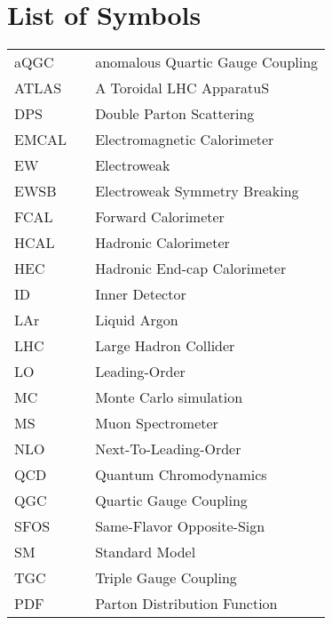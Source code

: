 \chapter*{List of Symbols}
  \begin{tabular}{lp{}p{}}
    aQGC        & \dotfill & anomalous Quartic Gauge Coupling \\
    ATLAS       & \dotfill & A Toroidal LHC ApparatuS \\
    DPS         & \dotfill & Double Parton Scattering \\
    EMCAL       & \dotfill & Electromagnetic Calorimeter \\
    EW          & \dotfill & Electroweak \\
    EWSB        & \dotfill & Electroweak Symmetry Breaking \\
    FCAL        & \dotfill & Forward Calorimeter \\
    HCAL        & \dotfill & Hadronic Calorimeter \\
    HEC         & \dotfill & Hadronic End-cap Calorimeter \\
    ID          & \dotfill & Inner Detector \\
    LAr         & \dotfill & Liquid Argon \\
    LHC         & \dotfill & Large Hadron Collider \\
    LO          & \dotfill & Leading-Order \\
    MC          & \dotfill & Monte Carlo simulation \\
    MS          & \dotfill & Muon Spectrometer \\
    NLO         & \dotfill & Next-To-Leading-Order \\
    QCD         & \dotfill & Quantum Chromodynamics \\
    QGC         & \dotfill & Quartic Gauge Coupling \\
    SFOS        & \dotfill & Same-Flavor Opposite-Sign \\
    SM          & \dotfill & Standard Model  \\
    TGC         & \dotfill & Triple Gauge Coupling \\
    PDF         & \dotfill & Parton Distribution Function \\



  \end{tabular}
